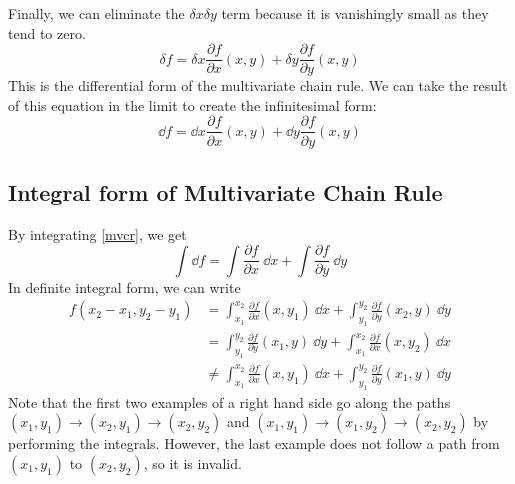 Finally, we can eliminate the \(\delta x \delta y\) term because it is vanishingly small as they tend to zero.
\begin{equation}
	\delta f = \delta x \frac{\partial f}{\partial x}(x, y) +
	\delta y\frac{\partial f}{\partial y}(x, y)
\end{equation}
This is the differential form of the multivariate chain rule.
We can take the result of this equation in the limit to create the infinitesimal form:
\begin{equation}\label{mvcr}
	\dd{f} = \dd{x} \frac{\partial f}{\partial x}(x, y) +
	\dd{y}\frac{\partial f}{\partial y}(x, y)
\end{equation}

\subsection{Integral form of Multivariate Chain Rule}
By integrating \eqref{mvcr}, we get
\[
	\int \dd{f} = \int \frac{\partial f}{\partial x}\ \dd{x} + \int \frac{\partial f}{\partial y}\ \dd{y}
\]
In definite integral form, we can write
\begin{align*}
	f(x_2 - x_1, y_2 - y_1) & = \int_{x_1}^{x_2} \frac{\partial f}{\partial x}(x, y_1)\ \dd{x} + \int_{y_1}^{y_2} \frac{\partial f}{\partial y}(x_2, y)\ \dd{y}    \\
	                        & = \int_{y_1}^{y_2} \frac{\partial f}{\partial y}(x_1, y)\ \dd{y} + \int_{x_1}^{x_2} \frac{\partial f}{\partial x}(x, y_2)\ \dd{x}    \\
	                        & \neq \int_{x_1}^{x_2} \frac{\partial f}{\partial x}(x, y_1)\ \dd{x} + \int_{y_1}^{y_2} \frac{\partial f}{\partial y}(x_1, y)\ \dd{y}
\end{align*}
Note that the first two examples of a right hand side go along the paths \((x_1, y_1) \to (x_2, y_1) \to (x_2, y_2)\) and \((x_1, y_1) \to (x_1, y_2) \to (x_2, y_2)\) by performing the integrals.
However, the last example does not follow a path from \((x_1, y_1)\) to \((x_2, y_2)\), so it is invalid.
